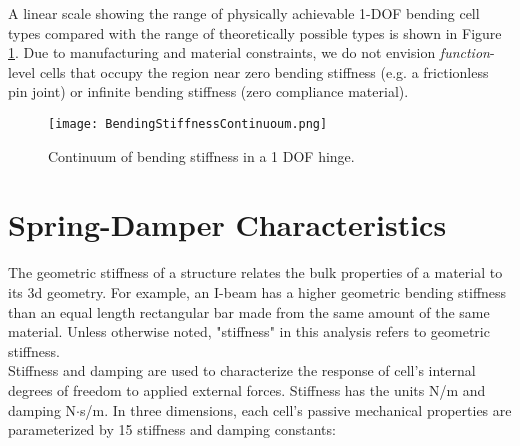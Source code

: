 {A linear scale showing the range of physically achievable 1-DOF bending cell types compared with the range of theoretically possible types is shown in Figure \ref{fig:BendingStiffnessContinuoum}.  Due to manufacturing and material constraints, we do not envision \textit{function}-level cells that occupy the region near zero bending stiffness (e.g. a frictionless pin joint) or infinite bending stiffness (zero compliance material).

\begin{figure}
  \texttt{[image: BendingStiffnessContinuoum.png]}
  \caption{Continuum of bending stiffness in a 1 DOF hinge.}
  \label{fig:BendingStiffnessContinuoum}
\end{figure}

\section{Spring-Damper Characteristics}

The geometric stiffness of a structure relates the bulk properties of a material to its 3d geometry.  For example, an I-beam has a higher geometric bending stiffness than an equal length rectangular bar made from the same amount of the same material.  Unless otherwise noted, "stiffness" in this analysis refers to geometric stiffness.\\

Stiffness and damping are used to characterize the response of cell's internal degrees of freedom to applied external forces.  Stiffness has the units N/m and damping N$\cdot$s/m.  In three dimensions, each cell's passive mechanical properties are parameterized by 15 stiffness and damping constants:

}
